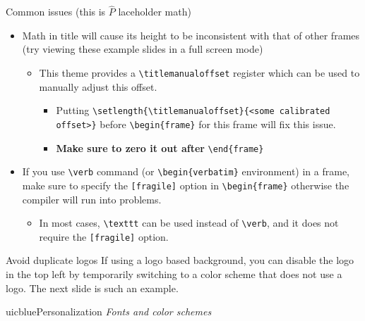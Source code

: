 \documentclass{beamer}
\begin{document}
\begin{frame}[fragile]{Common issues (this is $\hat P$ laceholder math)}
\begin{itemize}
\item Math in title will cause its height to be inconsistent with that of other frames (try viewing these example slides in a full screen mode)
\begin{itemize}
\item This theme provides a \verb|\titlemanualoffset| register which can be used to manually adjust this offset.
\begin{itemize}
\item Putting \verb|\setlength{\titlemanualoffset}{<some calibrated offset>}| before \verb|\begin{frame}| for this frame will fix this issue.
\item \textbf{Make sure to zero it out after} \verb|\end{frame}|
\end{itemize}
\end{itemize}
\item If you use \verb|\verb| command (or \verb|\begin{verbatim}| environment) in a frame, make sure to specify the \texttt{[fragile]} option in \verb|\begin{frame}| otherwise the compiler will run into problems.
\begin{itemize}
\item In most cases, \verb|\texttt| can be used instead of \verb|\verb|, and it does not require the \texttt{[fragile]} option.
\end{itemize}
\end{itemize}
\end{frame}
\setlength{\titlemanualoffset}{0.0ex}



\begin{frame}{Avoid duplicate logos}
If using a logo based background, you can disable the logo in the top left by temporarily switching to a color scheme that does not use a logo. The next slide is such an example.
\end{frame}



\begin{chapter}{uicblue}{Personalization}
\textit{Fonts and color schemes}
\end{chapter}
\end{document}
